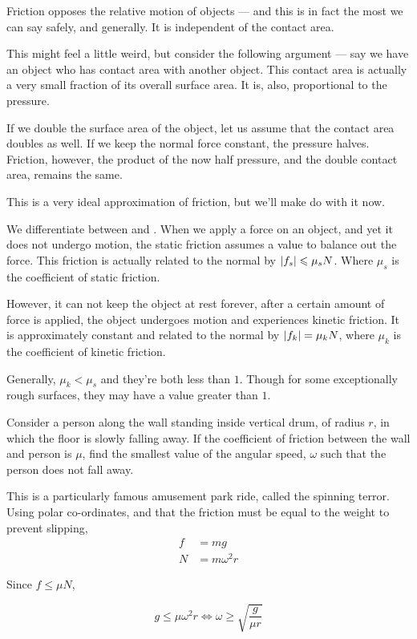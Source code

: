 Friction opposes the relative motion of objects --- and this is in fact the most we 
can say safely, and generally. It is independent of the contact area.

This might feel a little weird, but consider the following argument --- say we have an object 
who has contact area with another object. This contact area is actually a very small fraction 
of its overall surface area. It is, also, proportional to the pressure.

If we double the surface area of the object, let us assume that the contact area doubles as well.
If we keep the normal force constant, the pressure halves. Friction, however, the 
product of the now half pressure, and the double contact area, remains the same.

This is a very ideal approximation of friction, but we'll make do with it now. 

We differentiate between  and . When we apply 
a force on an object, and yet it does not undergo motion, the static friction assumes a value 
to balance out the force. This friction is actually related to the normal by \(\abs{f_s} \leqslant \mu_sN\).
Where \(\mu_s\) is the coefficient of static friction. 

However, it can not keep the object at rest forever, after a certain amount of force is applied, 
the object undergoes motion and experiences kinetic friction. It is approximately constant 
and related to the normal by \(\abs{f_k} = \mu_kN\), where \(\mu_k\) is the coefficient of kinetic friction.

Generally, \(\mu_k < \mu_s\) and they're both less than \(1\). Though for some exceptionally rough surfaces, they
may have a value greater than \(1\).

\begin{example}

    Consider a person along the wall standing inside vertical drum, of radius \(r\), in which the floor is slowly falling 
    away. If the coefficient of friction between the wall and person is \(\mu\), find 
    the smallest value of the angular speed, \(\omega\) such that the person does not fall away.

    \begin{soln}
        This is a particularly famous amusement park ride, called the spinning terror. Using
        polar co-ordinates, and that the friction must be equal to the weight to prevent slipping,
        \begin{align*}
            f &= mg \\
            N &= m\omega^2r
        \end{align*}
        
        Since \(f \le \mu N\),

        \begin{equation*}
            g \le \mu \omega^2 r \iff \omega \ge \sqrt{\frac{g}{\mu r}}
        \end{equation*}
        
    \end{soln}
\end{example}

